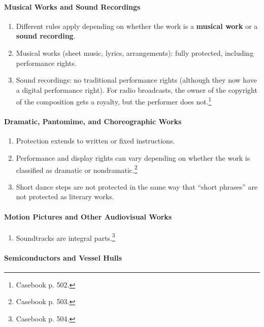 \paragraph{Musical Works and Sound Recordings}

\begin{enumerate}
    \item Different rules apply depending on whether the work is a 
    \textbf{musical work} or a \textbf{sound recording}.
    \item Musical works (sheet music, lyrics, arrangements): fully protected, 
    including performance rights.
    \item Sound recordings: no traditional performance rights (although they 
    now have a digital performance right). For radio broadcasts, the owner of 
    the copyright of the composition gets a royalty, but the performer does 
    not.\footnote{Casebook p. 502.}
\end{enumerate}

\paragraph{Dramatic, Pantomime, and Choreographic Works}

\begin{enumerate}
    \item Protection extends to written or fixed instructions. 
    \item Performance and display rights can vary depending on whether the 
    work is classified as dramatic or nondramatic.\footnote{Casebook p. 503.}
    \item Short dance steps are not protected in the same way that ``short 
    phrases'' are not protected as literary works.
\end{enumerate}

\paragraph{Motion Pictures and Other Audiovisual Works}

\begin{enumerate}
    \item Soundtracks are integral parts.\footnote{Casebook p. 504.}
\end{enumerate}

\paragraph{Semiconductors and Vessel Hulls}

